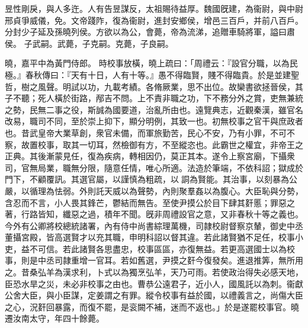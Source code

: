 \begin{pinyinscope}
 
昱性剛戾，與人多迕。人有告昱謀反，太祖賜待益厚。魏國旣建，為衞尉，與中尉邢貞爭威儀，免。文帝踐阼，復為衞尉，進封安鄉侯，增邑三百戶，并前八百戶。分封少子延及孫曉列侯。方欲以為公，會薨，帝為流涕，追贈車騎將軍，謚曰肅侯。
 子武嗣。武薨，子克嗣。克薨，子良嗣。
 
 
曉，嘉平中為黃門侍郎。
 時校事放橫，曉上疏曰：「周禮云：『設官分職，以為民極。』春秋傳曰：『天有十日，人有十等。』愚不得臨賢，賤不得臨貴。於是並建聖哲，樹之風聲。明試以功，九載考績。各脩厥業，思不出位。故欒書欲拯晉侯，其子不聽；死人橫於街路，邴吉不問。上不責非職之功，下不務分外之賞，吏無兼統之勢，民無二事之役，斯誠為國要道，治亂所由也。遠覽典志，近觀秦漢，雖官名改易，職司不同，至於崇上抑下，顯分明例，其致一也。初無校事之官干與庶政者也。昔武皇帝大業草創，衆官未備，而軍旅勤苦，民心不安，乃有小罪，不可不察，故置校事，取其一切耳，然檢御有方，不至縱恣也。此霸世之權宜，非帝王之正典。其後漸蒙見任，復為疾病，轉相因仍，莫正其本。遂令上察宮廟，下攝衆司，官無局業，職無分限，隨意任情，唯心所適。法造於筆端，不依科詔；獄成於門下，不顧覆訊。其選官屬，以謹慎為粗疏，以𧩪詷為賢能。其治事，以刻暴為公嚴，以循理為怯弱。外則託天威以為聲勢，內則聚羣姦以為腹心。大臣恥與分勢，含忍而不言，小人畏其鋒芒，鬱結而無告。至使尹摸公於目下肆其姧慝；罪惡之著，行路皆知，纖惡之過，積年不聞。旣非周禮設官之意，又非春秋十等之義也。今外有公卿將校總統諸署，內有侍中尚書綜理萬機，司隷校尉督察京輦，御史中丞董攝宮殿，皆高選賢才以充其職，申明科詔以督其違。若此諸賢猶不足任，校事小吏，益不可信。若此諸賢各思盡忠，校事區區，亦復無益。若更高選國士以為校事，則是中丞司隷重增一官耳。若如舊選，尹摸之姧今復發矣。進退推筭，無所用之。昔桑弘羊為漢求利，卜式以為獨烹弘羊，天乃可雨。若使政治得失必感天地，臣恐水旱之災，未必非校事之由也。曹恭公遠君子，近小人，國風託以為刺。衞獻公舍大臣，與小臣謀，定姜謂之有罪。縱令校事有益於國，以禮義言之，尚傷大臣之心，況姧回暴露，而復不罷，是衮闕不補，迷而不返也。」於是遂罷校事官。曉遷汝南太守，年四十餘薨。
 
 
\end{pinyinscope}